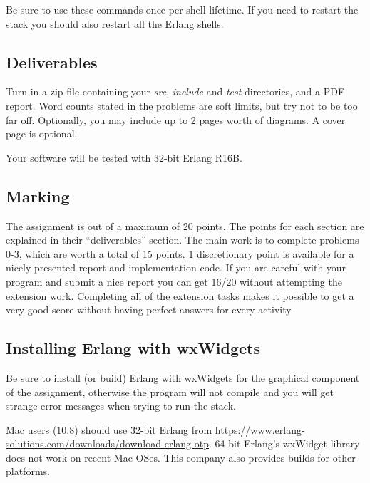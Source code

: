 \documentclass[a4paper]{article}
\begin{document}
Be sure to use these commands once per shell lifetime. If you need to restart
the stack you should also restart all the Erlang shells.


\subsection*{Deliverables} %
\label{sub:deliverables}

Turn in a zip file containing your \emph{src}, \emph{include} and \emph{test}
directories, and a PDF report. Word counts stated in the problems are soft
limits, but try not to be too far off. Optionally, you may include up to 2
pages worth of diagrams. A cover page is optional.

Your software will be tested with 32-bit Erlang R16B.


\subsection*{Marking} %
\label{sub:marking}

The assignment is out of a maximum of 20 points. The points for each section
are explained in their ``deliverables'' section. The main work is to complete
problems 0-3, which are worth a total of 15 points. 1 discretionary point is
available for a nicely presented report and implementation code. If you
are careful with your program and submit a nice report you can get 16/20
without attempting the extension work. Completing all of the extension tasks
makes it possible to get a very good score without having perfect answers for
every activity.



\subsection*{Installing Erlang with wxWidgets} %
\label{sub:installing_erlang_and_wx}

Be sure to install (or build) Erlang with wxWidgets for the graphical
component of the assignment, otherwise the program will not compile and you
will get strange error messages when trying to run the stack.

Mac users (10.8) should use 32-bit Erlang from
\url{https://www.erlang-solutions.com/downloads/download-erlang-otp}. 64-bit
Erlang's wxWidget library does not work on recent Mac OSes. This
company also provides builds for other platforms.
\end{document}
